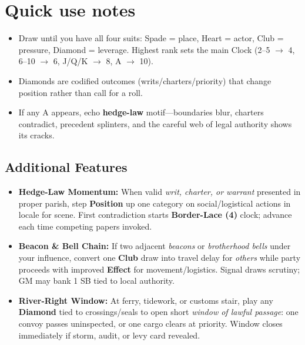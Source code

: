 \section*{Quick use notes}
\label{sec:viterra-quick-use}
\begin{itemize}
\item Draw until you have all four suits: Spade = place, Heart = actor, Club = pressure, Diamond = leverage. Highest rank sets the main Clock (2--5 $\rightarrow$ 4, 6--10 $\rightarrow$ 6, J/Q/K $\rightarrow$ 8, A $\rightarrow$ 10).
\item Diamonds are codified outcomes (writs/charters/priority) that change position rather than call for a roll.
\item If any A appears, echo \textbf{hedge-law} motif—boundaries blur, charters contradict, precedent splinters, and the careful web of legal authority shows its cracks.
\end{itemize}

\subsection*{Additional Features}
\begin{itemize}
\item \textbf{Hedge-Law Momentum:} When valid \emph{writ, charter, or warrant} presented in proper parish, step \textbf{Position} up one category on social/logistical actions in locale for scene. First contradiction starts \textbf{Border-Lace (4)} clock; advance each time competing papers invoked.
\item \textbf{Beacon \& Bell Chain:} If two adjacent \emph{beacons} or \emph{brotherhood bells} under your influence, convert one \textbf{Club} draw into travel delay for \emph{others} while party proceeds with improved \textbf{Effect} for movement/logistics. Signal draws scrutiny; GM may bank 1 SB tied to local authority.
\item \textbf{River-Right Window:} At ferry, tidework, or customs stair, play any \textbf{Diamond} tied to crossings/seals to open short \emph{window of lawful passage}: one convoy passes uninspected, or one cargo clears at priority. Window closes immediately if storm, audit, or levy card revealed.
\end{itemize}

